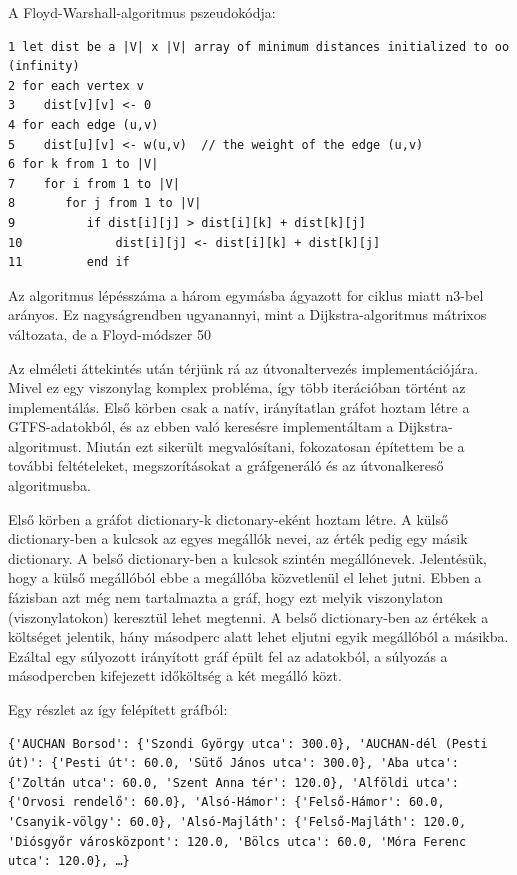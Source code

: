 A Floyd-Warshall-algoritmus pszeudokódja:

\begin{verbatim}
1 let dist be a |V| x |V| array of minimum distances initialized to oo (infinity)
2 for each vertex v
3    dist[v][v] <- 0
4 for each edge (u,v)
5    dist[u][v] <- w(u,v)  // the weight of the edge (u,v)
6 for k from 1 to |V|
7    for i from 1 to |V|
8       for j from 1 to |V|
9          if dist[i][j] > dist[i][k] + dist[k][j] 
10             dist[i][j] <- dist[i][k] + dist[k][j]
11         end if
\end{verbatim}

Az algoritmus lépésszáma a három egymásba ágyazott for ciklus miatt n3-bel arányos. Ez nagyságrendben ugyanannyi, mint a Dijkstra-algoritmus mátrixos változata, de a Floyd-módszer 50%


Az elméleti áttekintés után térjünk rá az útvonaltervezés implementációjára. Mivel ez egy viszonylag komplex probléma, így több iterációban történt az implementálás. Első körben csak a natív, irányítatlan gráfot hoztam létre a GTFS-adatokból, és az ebben való keresésre implementáltam a Dijkstra-algoritmust. Miután ezt sikerült megvalósítani, fokozatosan építettem be a további feltételeket, megszorításokat a gráfgeneráló és az útvonalkereső algoritmusba.

Első körben a gráfot dictionary-k dictonary-eként hoztam létre. A külső dictionary-ben a kulcsok az egyes megállók nevei, az érték pedig egy másik dictionary. A belső dictionary-ben a kulcsok szintén megállónevek. Jelentésük, hogy a külső megállóból ebbe a megállóba közvetlenül el lehet jutni. Ebben a fázisban azt még nem tartalmazta a gráf, hogy ezt melyik viszonylaton (viszonylatokon) keresztül lehet megtenni. A belső dictionary-ben az értékek a költséget jelentik, hány másodperc alatt lehet eljutni egyik megállóból a másikba. Ezáltal egy súlyozott irányított gráf épült fel az adatokból, a súlyozás a másodpercben kifejezett időköltség a két megálló közt.

Egy részlet az így felépített gráfból:

\begin{verbatim}
{'AUCHAN Borsod': {'Szondi György utca': 300.0}, 'AUCHAN-dél (Pesti út)': {'Pesti út': 60.0, 'Sütő János utca': 300.0}, 'Aba utca': {'Zoltán utca': 60.0, 'Szent Anna tér': 120.0}, 'Alföldi utca': {'Orvosi rendelő': 60.0}, 'Alsó-Hámor': {'Felső-Hámor': 60.0, 'Csanyik-völgy': 60.0}, 'Alsó-Majláth': {'Felső-Majláth': 120.0, 'Diósgyőr városközpont': 120.0, 'Bölcs utca': 60.0, 'Móra Ferenc utca': 120.0}, …}
\end{verbatim}

